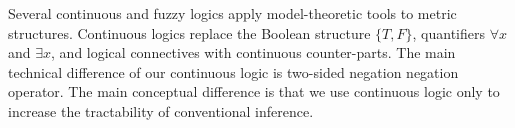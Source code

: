 Several continuous \cite{levin2000continuous} and fuzzy \cite{klir1995fuzzy} logics apply model-theoretic tools to metric structures.
Continuous logics replace the Boolean structure $\{T, F\}$, quantifiers $\forall x$ and $\exists x$, and logical connectives with continuous counter-parts.
The main technical difference of our continuous logic is two-sided negation negation operator. 
The main conceptual difference is that we use continuous logic only to increase the tractability of conventional inference.



